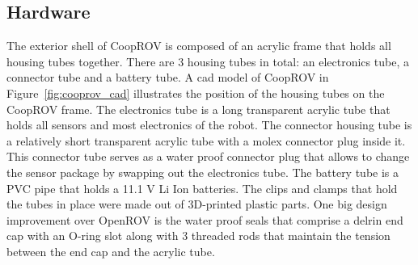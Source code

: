 \documentclass {udthesis}
\begin{document}
\subsection{Hardware}

The exterior shell of CoopROV is composed of an acrylic frame that holds all housing tubes together. There are 3 housing tubes in total: an electronics tube, a connector tube and a battery tube. A \gls{cad} model of CoopROV in Figure~\ref{fig:cooprov_cad} illustrates the position of the housing tubes on the CoopROV frame. The electronics tube is a long transparent acrylic tube that holds all sensors and most electronics of the robot. The connector housing tube is a relatively short transparent acrylic tube with a molex connector plug inside it. This connector tube serves as a water proof connector plug that allows to change the sensor package by swapping out the electronics tube. The battery tube is a PVC pipe that holds a 11.1 V Li Ion batteries. The clips and clamps that hold the tubes in place were made out of 3D-printed plastic parts. One big design improvement over OpenROV is the water proof seals that comprise a delrin end cap with an O-ring slot along with 3 threaded rods that maintain the tension 
between the end cap and the acrylic tube. 
%
\end{document}
